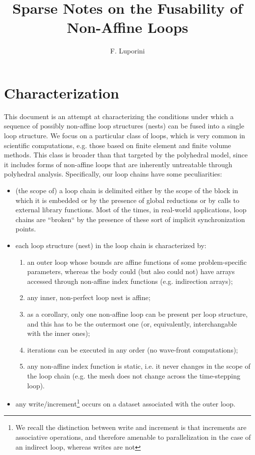 \documentclass[a4paper]{article}
\title{Sparse Notes on the Fusability of Non-Affine Loops}
\author{F. Luporini}
\date{}
\begin{document}
\lstset{language=C, breaklines=true}
 
\maketitle
\tableofcontents

\clearpage

\section{Characterization}
This document is an attempt at characterizing the conditions under which a sequence of possibly non-affine loop structures (nests) can be fused into a single loop structure. We focus on a particular class of loops, which is very common in scientific computations, e.g. those based on finite element and finite volume methods. This class is broader than that targeted by the polyhedral model, since it includes forms of non-affine loops that are inherently untreatable through polyhedral analysis. Specifically, our loop chains have some peculiarities:
\begin{itemize}
\item (the scope of) a loop chain is delimited either by the scope of the block in which it is embedded or by the presence of global reductions or by calls to external library functions. Most of the times, in real-world applications, loop chains are ``broken`` by the presence of these sort of implicit synchronization points.
\item each loop structure (nest) in the loop chain is characterized by:
  \begin{enumerate}
  \item an outer loop whose bounds are affine functions of some problem-specific parameters, whereas the body could (but also could not) have arrays accessed through non-affine index functions (e.g. indirection arrays);
  \item any inner, non-perfect loop nest is affine;
  \item as a corollary, only one non-affine loop can be present per loop structure, and this has to be the outermost one (or, equivalently, interchangable with the inner ones);
  \item iterations can be executed in any order (no wave-front computations);
  \item any non-affine index function is static, i.e. it never changes in the scope of the loop chain (e.g. the mesh does not change across the time-stepping loop).
  \end{enumerate}
\item any write/increment\footnote{We recall the distinction between write and increment is that increments are associative operations, and therefore amenable to parallelization in the case of an indirect loop, whereas writes are not} occurs on a dataset associated with the outer loop.
\end{itemize}
\end{document}
